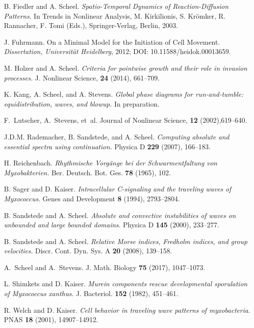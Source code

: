 \documentclass[10pt]{article}
\begin{document}
{\small
\begin{thebibliography}{99}
B. Fiedler and A. Scheel.
\textit{Spatio-Temporal Dynamics of Reaction-Diffusion Patterns.}
In Trends in Nonlinear Analysis, M. Kirkilionis, S. Krömker, R. Rannacher, F. Tomi (Eds.), Springer-Verlag, Berlin, 2003.

 J. Fuhrmann. 
\newblock On a Minimal Model for the Initiation of Cell Movement.
\newblock \textit{Dissertation, Universit\"at Heidelberg}, 2012; DOI: 10.11588/heidok.00013659.

M. Holzer and A. Scheel.
\newblock\textit{ Criteria for pointwise growth and their role in invasion processes.}
\newblock J. Nonlinear Science, \textbf{24} (2014), 661--709.

K. Kang, A. Scheel, and A. Stevens.
\textit{Global phase diagrams for run-and-tumble: equidistribution, waves, and blowup.}
In preparation.

F.~Lutscher, A.~Stevens, et~al.
\newblock Journal of Nonlinear Science, \textbf{12} (2002),619--640.

 J.D.M. Rademacher, B. Sandstede, and A. Scheel.
\textit{Computing absolute and essential spectra using continuation.}
Physica D \textbf{229} (2007), 166--183.

 H. Reichenbach.
\textit{Rhythmische Vorg\"ange bei der Schwarmentfaltung
von Myxobakterien.}
Ber. Deutsch. Bot. Ges.  
\textbf{78} (1965), 102. 

 B. Sager and D. Kaiser.
\textit{Intracellular C-signaling and the traveling waves of
Myxococcus.} Genes and Development \textbf{8} (1994), 
2793--2804.

 B. Sandstede and A. Scheel.
\textit{Absolute and convective instabilities of waves on unbounded and large bounded domains.}
Physica D \textbf{145} (2000), 233--277.

 B. Sandstede and A. Scheel.
\textit{Relative Morse indices, Fredholm indices, and group velocities.}
Discr. Cont. Dyn. Sys. A \textbf{20} (2008), 139--158.

A.~Scheel and A.~Stevens.
\newblock J. Math. Biology \textbf{75} (2017), 1047--1073.

 L. Shimkets and D. Kaiser.
\textit{Murein components rescue developmental
sporulation of Myxococcus xanthus.} J. Bacteriol. \textbf{152}
(1982), 451--461.

 R. Welch and D. Kaiser.
\textit{Cell behavior in traveling wave patterns of myxobacteria.}
PNAS \textbf{18} (2001), 14907--14912.


\end{thebibliography}}
\end{document}
